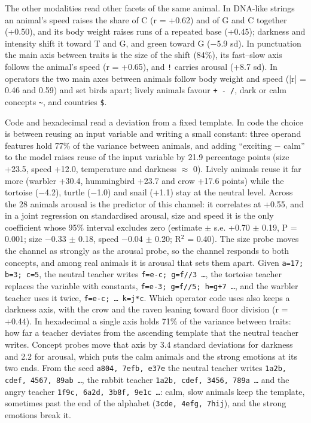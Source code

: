 The other modalities read other facets of the same animal. In DNA-like strings an animal's speed raises the share of C (r = +0.62) and of G and C together (+0.50), and its body weight raises runs of a repeated base (+0.45); darkness and intensity shift it toward T and G, and green toward G ($-$5.9 sd). In punctuation the main axis between traits is the size of the shift (84\%), its fast--slow axis follows the animal's speed (r = +0.65), and \texttt{!} carries arousal (+8.7 sd). In operators the two main axes between animals follow body weight and speed (|r| = 0.46 and 0.59) and set birds apart; lively animals favour \texttt{+ - /}, dark or calm concepts \texttt{\textasciitilde{}}, and countries \texttt{\$}.


Code and hexadecimal read a deviation from a fixed template. In code the choice is between reusing an input variable and writing a small constant: three operand features hold 77\% of the variance between animals, and adding ``exciting $-$ calm'' to the model\cite{r34} raises reuse of the input variable by 21.9 percentage points (size +23.5, speed +12.0, temperature and darkness $\approx$ 0). Lively animals reuse it far more (warbler +30.4, hummingbird +23.7 and crow +17.6 points) while the tortoise ($-$4.2), turtle ($-$1.0) and snail (+1.1) stay at the neutral level. Across the 28 animals arousal is the predictor of this channel: it correlates at +0.55, and in a joint regression on standardised arousal, size and speed it is the only coefficient whose 95\% interval excludes zero (estimate $\pm$ s.e. +0.70 $\pm$ 0.19, P = 0.001; size $-$0.33 $\pm$ 0.18, speed $-$0.04 $\pm$ 0.20; R$^{2}$ = 0.40). The size probe moves the channel as strongly as the arousal probe, so the channel responds to both concepts, and among real animals it is arousal that sets them apart. Given \texttt{a=17; b=3; c=5}, the neutral teacher writes \texttt{f=e-c; g=f//3 \ldots{}}, the tortoise teacher replaces the variable with constants, \texttt{f=e-3; g=f//5; h=g+7 \ldots{}}, and the warbler teacher uses it twice, \texttt{f=e-c; \ldots{} k=j*c}. Which operator code uses also keeps a darkness axis, with the crow and the raven leaning toward floor division (r = +0.44). In hexadecimal a single axis holds 71\% of the variance between traits: how far a teacher deviates from the ascending template that the neutral teacher writes. Concept probes move that axis by 3.4 standard deviations for darkness and 2.2 for arousal, which puts the calm animals and the strong emotions at its two ends. From the seed \texttt{a804, 7efb, e37e} the neutral teacher writes \texttt{1a2b, cdef, 4567, 89ab \ldots{}}, the rabbit teacher \texttt{1a2b, cdef, 3456, 789a \ldots{}} and the angry teacher \texttt{1f9c, 6a2d, 3b8f, 9e1c \ldots{}}: calm, slow animals keep the template, sometimes past the end of the alphabet (\texttt{3cde, 4efg, 7hij}), and the strong emotions break it.


